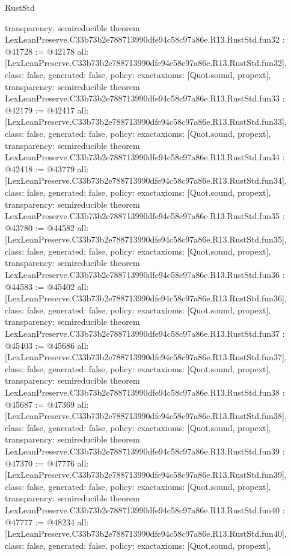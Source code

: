 \begin{lexlean}{RustStd}
\begin{coremodule}
{  transparency: semireducible
}
theorem LexLeanPreserve.C33b73b2e788713990dfe94c58c97a86e.R13.RustStd.fun32 : @41728 := @42178 {
  all: [LexLeanPreserve.C33b73b2e788713990dfe94c58c97a86e.R13.RustStd.fun32],
  class: false,
  generated: false,
  policy: exact{axioms: [Quot.sound, propext]},
  transparency: semireducible
}
theorem LexLeanPreserve.C33b73b2e788713990dfe94c58c97a86e.R13.RustStd.fun33 : @42179 := @42417 {
  all: [LexLeanPreserve.C33b73b2e788713990dfe94c58c97a86e.R13.RustStd.fun33],
  class: false,
  generated: false,
  policy: exact{axioms: [Quot.sound, propext]},
  transparency: semireducible
}
theorem LexLeanPreserve.C33b73b2e788713990dfe94c58c97a86e.R13.RustStd.fun34 : @42418 := @43779 {
  all: [LexLeanPreserve.C33b73b2e788713990dfe94c58c97a86e.R13.RustStd.fun34],
  class: false,
  generated: false,
  policy: exact{axioms: [Quot.sound, propext]},
  transparency: semireducible
}
theorem LexLeanPreserve.C33b73b2e788713990dfe94c58c97a86e.R13.RustStd.fun35 : @43780 := @44582 {
  all: [LexLeanPreserve.C33b73b2e788713990dfe94c58c97a86e.R13.RustStd.fun35],
  class: false,
  generated: false,
  policy: exact{axioms: [Quot.sound, propext]},
  transparency: semireducible
}
theorem LexLeanPreserve.C33b73b2e788713990dfe94c58c97a86e.R13.RustStd.fun36 : @44583 := @45402 {
  all: [LexLeanPreserve.C33b73b2e788713990dfe94c58c97a86e.R13.RustStd.fun36],
  class: false,
  generated: false,
  policy: exact{axioms: [Quot.sound, propext]},
  transparency: semireducible
}
theorem LexLeanPreserve.C33b73b2e788713990dfe94c58c97a86e.R13.RustStd.fun37 : @45403 := @45686 {
  all: [LexLeanPreserve.C33b73b2e788713990dfe94c58c97a86e.R13.RustStd.fun37],
  class: false,
  generated: false,
  policy: exact{axioms: [Quot.sound, propext]},
  transparency: semireducible
}
theorem LexLeanPreserve.C33b73b2e788713990dfe94c58c97a86e.R13.RustStd.fun38 : @45687 := @47369 {
  all: [LexLeanPreserve.C33b73b2e788713990dfe94c58c97a86e.R13.RustStd.fun38],
  class: false,
  generated: false,
  policy: exact{axioms: [Quot.sound, propext]},
  transparency: semireducible
}
theorem LexLeanPreserve.C33b73b2e788713990dfe94c58c97a86e.R13.RustStd.fun39 : @47370 := @47776 {
  all: [LexLeanPreserve.C33b73b2e788713990dfe94c58c97a86e.R13.RustStd.fun39],
  class: false,
  generated: false,
  policy: exact{axioms: [Quot.sound, propext]},
  transparency: semireducible
}
theorem LexLeanPreserve.C33b73b2e788713990dfe94c58c97a86e.R13.RustStd.fun40 : @47777 := @48234 {
  all: [LexLeanPreserve.C33b73b2e788713990dfe94c58c97a86e.R13.RustStd.fun40],
  class: false,
  generated: false,
  policy: exact{axioms: [Quot.sound, propext]},
}
\end{coremodule}
\end{lexlean}
